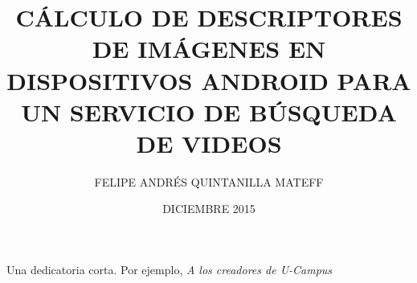 \documentclass[upright, contnum]{umemoria}
\author{FELIPE ANDRÉS QUINTANILLA MATEFF}
\title{CÁLCULO DE DESCRIPTORES DE IMÁGENES EN DISPOSITIVOS ANDROID PARA UN SERVICIO DE BÚSQUEDA DE VIDEOS}
\date{DICIEMBRE 2015}
\begin{document}
\frontmatter
\maketitle

\begin{abstract}
{\lipsum[1-4]}
\end{abstract}

\begin{dedicatoria} %
Una dedicatoria corta. Por ejemplo, \emph{A los creadores de U-Campus}
\end{dedicatoria}

\begin{thanks} %
\lipsum[1-2]
\end{thanks}
\cleardoublepage

\tableofcontents
\listoffigures %

\mainmatter













\end{document}
